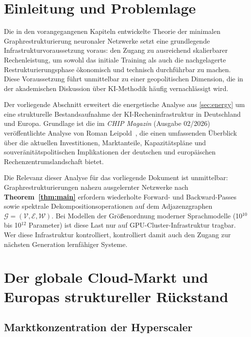 \documentclass[12pt, a4paper, openany]{report}
\newcommand{\calG}{\mathcal{G}}
\newcommand{\calV}{\mathcal{V}}
\newcommand{\calE}{\mathcal{E}}
\newcommand{\calW}{\mathcal{W}}
\begin{document}
\section{Einleitung und Problemlage}

Die in den vorangegangenen Kapiteln entwickelte Theorie der minimalen
Graphrestrukturierung neuronaler Netzwerke setzt eine grundlegende
Infrastrukturvoraussetzung voraus: den Zugang zu ausreichend skalierbarer
Rechenleistung, um sowohl das initiale Training als auch die nachgelagerte
Restrukturierungsphase ökonomisch und technisch durchführbar zu machen.
Diese Voraussetzung führt unmittelbar zu einer geopolitischen Dimension, die
in der akademischen Diskussion über KI-Methodik häufig vernachlässigt wird.

Der vorliegende Abschnitt erweitert die energetische Analyse aus
\cref{sec:energy} um eine strukturelle Bestandsaufnahme der
KI-Recheninfrastruktur in Deutschland und Europa. Grundlage ist die im
\textit{CHIP Magazin} (Ausgabe 02/2026) veröffentlichte Analyse von Roman
Leipold~\cite{leipold2026chip}, die einen umfassenden Überblick über die
aktuellen Investitionen, Marktanteile, Kapazitätspläne und
souveränitätspolitischen Implikationen der deutschen und europäischen
Rechenzentrumslandschaft bietet.

Die Relevanz dieser Analyse für das vorliegende Dokument ist unmittelbar:
Graphrestrukturierungen nahezu ausgelernter Netzwerke nach
\textbf{Theorem~\ref{thm:main}} erfordern wiederholte Forward- und
Backward-Passes sowie spektrale Dekompositionsoperationen auf dem
Adjazenzgraphen $\calG = (\calV, \calE, \calW)$. Bei Modellen der Größenordnung
moderner Sprachmodelle (10$^{10}$ bis 10$^{12}$ Parameter) ist diese Last
nur auf GPU-Cluster-Infrastruktur tragbar. Wer diese Infrastruktur kontrolliert,
kontrolliert damit auch den Zugang zur nächsten Generation lernfähiger Systeme.

\section{Der globale Cloud-Markt und Europas struktureller Rückstand}
\label{sec:cloud_markt}

\subsection{Marktkonzentration der Hyperscaler}
\end{document}
